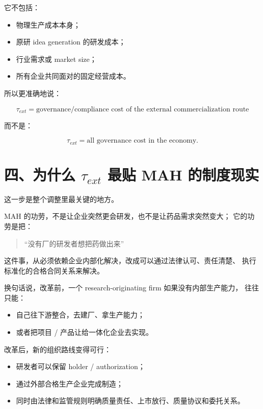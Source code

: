 \documentclass[12pt]{ctexart}
\begin{document}
它不包括：

\begin{itemize}[leftmargin=2em]
    \item 物理生产成本本身；
    \item 原研 idea generation 的研发成本；
    \item 行业需求或 market size；
    \item 所有企业共同面对的固定经营成本。
\end{itemize}

所以更准确地说：

\[
\tau_{ext}
=
\text{governance/compliance cost of the external commercialization route}
\]

而不是：

\[
\tau_{ext}
=
\text{all governance cost in the economy.}
\]

\section{四、为什么 \texorpdfstring{$\tau_{ext}$}{tau\_ext} 最贴 MAH 的制度现实}

这一步是整个调整里最关键的地方。

MAH 的功劳，不是让企业突然更会研发，也不是让药品需求突然变大；
它的功劳是把：

\begin{quote}
“没有厂的研发者想把药做出来”
\end{quote}

这件事，从必须依赖企业内部化解决，改成可以通过法律认可、责任清楚、
执行标准化的合格合同关系来解决。

换句话说，改革前，一个 research-originating firm 如果没有内部生产能力，
往往只能：

\begin{itemize}[leftmargin=2em]
    \item 自己往下游整合，去建厂、拿生产能力；
    \item 或者把项目 / 产品让给一体化企业去实现。
\end{itemize}

改革后，新的组织路线变得可行：

\begin{itemize}[leftmargin=2em]
    \item 研发者可以保留 holder / authorization；
    \item 通过外部合格生产企业完成制造；
    \item 同时由法律和监管规则明确质量责任、上市放行、质量协议和委托关系。
\end{itemize}
\end{document}

